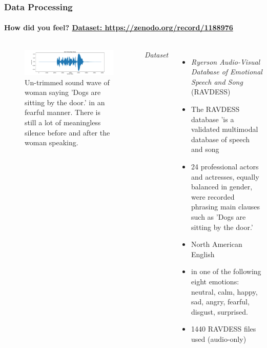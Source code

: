 \documentclass[10pt,usepdftitle=false,aspectratio=169]{beamer}
\begin{document}


\begin{frame}\frametitle{Data Processing}
    \framesubtitle{How did you feel?  \hspace*{30em} \href{https://zenodo.org/record/1188976}{Dataset: https://zenodo.org/record/1188976}}
    
    \vspace{1.5em}


  
	\begin{columns}
		\begin{figure}
			\centering
			\includegraphics[width=.8\textwidth]{figures/untr_raw_wave.pdf}
			\caption{Un-trimmed sound wave of woman saying 'Dogs are sitting by the door.' in an fearful manner. There is still a lot of meaningless silence before and after the woman speaking. }
			\label{fig:untrimmed sw}
		\end{figure}
\emph{Dataset}
\begin{itemize}
	\item \textit{Ryerson Audio-Visual Database of Emotional Speech and Song} (RAVDESS)
	\item The RAVDESS database 'is a validated multimodal database of speech and song 
	\item  24 professional actors and actresses, equally balanced in gender, were recorded phrasing main clauses such as  'Dogs are sitting by the door.' 
	\item  North American English 
	\item in one of the following eight emotions: neutral, calm, happy, sad, angry, fearful, disgust, surprised.
	\item  1440 RAVDESS files used  (audio-only) 
	
\end{itemize}
	\end{columns}


\end{frame}
\end{document}
